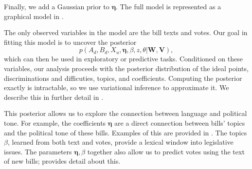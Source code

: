 Finally, we add a Gaussian prior to $\bm \eta$.  The full model is
represented as a graphical model in .

The only observed variables in the model are the bill texts and votes.
Our goal in fitting this model is to uncover the posterior
\begin{equation}
  p(A_d, B_d, X_u, \bm \eta, \beta, z, \theta | \bm W, \bm V), \label{eq:posterior}
\end{equation}
which can then be used in exploratory or predictive tasks.
Conditioned on these variables, our analysis proceeds with the
posterior distribution of the ideal points, discriminations and
difficuties, topics, and coefficients. Computing the posterior exactly
is intractable, so we use variational inference to approximate it.  We
describe this in further detail in .


This posterior allows us to explore the connection between language
and political tone.  For example, the coefficients $\bm \eta$ are a
direct connection between bills' topics and the political tone of
these bills. Examples of this are provided in .
The topics $\beta$, learned from both text and votes, provide a
lexical window into legislative issues.  The parameters $\bm \eta,
\beta$ together also allow us to predict votes using the text of
new bills;  provides detail about this.



